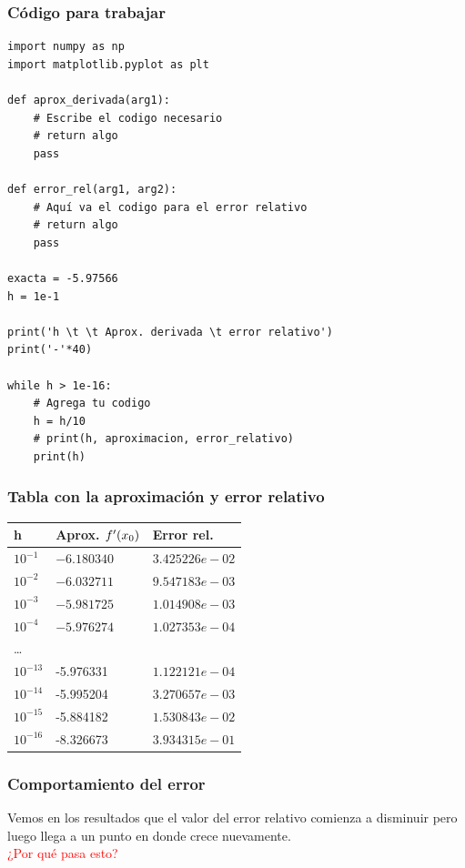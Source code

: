 \documentclass[12pt]{beamer}
\begin{document}
\begin{frame}
\frametitle{Código para trabajar}
\begin{lstlisting}[caption=Código para la aproximación de la derivada]
import numpy as np
import matplotlib.pyplot as plt

def aprox_derivada(arg1):
    # Escribe el codigo necesario
    # return algo
    pass

def error_rel(arg1, arg2):
    # Aquí va el codigo para el error relativo
    # return algo
    pass

exacta = -5.97566
h = 1e-1

print('h \t \t Aprox. derivada \t error relativo')
print('-'*40)

while h > 1e-16:
    # Agrega tu codigo
    h = h/10
    # print(h, aproximacion, error_relativo)
    print(h)
\end{lstlisting}
\end{frame}
\begin{frame}[fragile]
\begin{table}
\frametitle{Tabla con la aproximación y error relativo}
\renewcommand{\arraystretch}{0.9}
\centering
\begin{tabular}{l | p{3.5cm} | p{3cm}}
h & Aprox. ${f}^{\prime} (x_{0})$ & Error rel. \\ \hline
$10^{-1}$ & $-6.180340$ & $3.425226e-02$ \\ \hline
$10^{-2}$ & $-6.032711$ & $9.547183e-03$ \\ \hline
$10^{-3}$ & $-5.981725$ & $1.014908e-03$ \\ \hline
$10^{-4}$ & $-5.976274$ & $1.027353e-04$ \\ \hline
\ldots & & \\ \hline
$10^{-13}$ & {-5.976331} & $1.122121e-04$ \\ \hline
$10^{-14}$ & {-5.995204} & $3.270657e-03$ \\ \hline
$10^{-15}$ & {-5.884182} & $1.530843e-02$ \\ \hline
$10^{-16}$ & {-8.326673} & $3.934315e-01$ \\ \hline
\end{tabular}
\end{table}
\end{frame}
\begin{frame}[fragile]
\frametitle{Comportamiento del error}
Vemos en los resultados que el valor del error relativo comienza a disminuir pero luego llega a un punto en donde crece nuevamente.
\\
\bigskip
\pause
\textcolor{red}{¿Por qué pasa esto?}
\end{frame}
\end{document}
